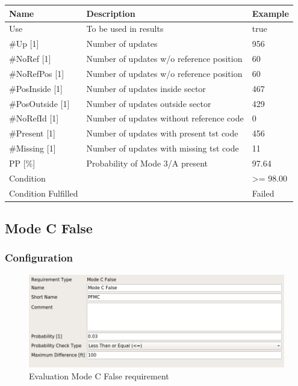 \begin{center}
 \begin{table}[H]
  \begin{tabularx}{\textwidth}{ | l | X |  l | }
    \hline
    \textbf{Name} & \textbf{Description} & \textbf{Example} \\ \hline
    Use & To be used in results & true \\ \hline
    \#Up [1] & Number of updates & 956 \\ \hline
    \#NoRef [1] & Number of updates w/o reference position & 60 \\ \hline
    \#NoRefPos [1] & Number of updates w/o reference position  & 60 \\ \hline
    \#PosInside [1] & Number of updates inside sector & 467 \\ \hline
    \#PosOutside [1] & Number of updates outside sector & 429 \\ \hline
    \#NoRefId [1] & Number of updates without reference code & 0 \\ \hline
    \#Present [1] & Number of updates with present tst code & 456 \\ \hline
    \#Missing [1] & Number of updates with missing tst code & 11 \\ \hline
    PP [\%] & Probability of Mode 3/A present & 97.64 \\ \hline
    Condition &  & >= 98.00 \\ \hline
    Condition Fulfilled &  & Failed \\ \hline
\end{tabularx}
\end{table}
\end{center}


\subsection{Mode C False}
\label{sec:eval_req_mc_false} 

\subsubsection{Configuration}

\begin{figure}[H]
    \includegraphics[width=14cm,frame]{figures/eval_req_mc_false.png}
  \caption{Evaluation Mode C False requirement}
\end{figure}

